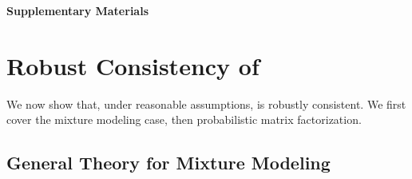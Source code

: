 
\renewcommand{\thefigure}{\Alph{section}.\arabic{figure}}
\renewcommand{\thetable}{\Alph{section}.\arabic{table}}
\renewcommand{\thetheorem}{\Alph{section}.\arabic{theorem}}
\renewcommand{\thelemma}{\Alph{section}.\arabic{lemma}}
\renewcommand{\theassumption}{\Alph{section}.\arabic{assumption}}
\renewcommand{\thedefinition}{\Alph{section}.\arabic{definition}}
\renewcommand{\theproposition}{\Alph{section}.\arabic{proposition}}


\begin{center}
    \LARGE \textbf{Supplementary Materials}
\end{center}

%	


\section{Robust Consistency of \methodname} 
\label{sec:theory}


We now show that, under reasonable assumptions, \methodname is robustly consistent.
We first cover the mixture modeling case, then probabilistic matrix factorization.

\subsection{General Theory for Mixture Modeling}

